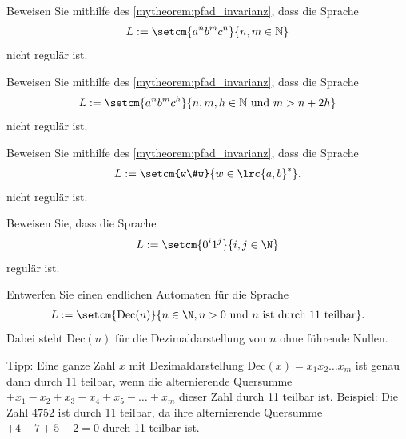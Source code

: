 \begin{myexercise}\label{myexercise:0405}
	Beweisen Sie mithilfe des \cref{mytheorem:pfad_invarianz}, dass die Sprache
	\begin{align}\label{eq:L2}
		L := \setcm{a^n b^m c^n}{n,m\in\mathbb{N}}
	\end{align}
	nicht regulär ist.
\end{myexercise}

\begin{myexercise}\label{myexercise:0406}
	Beweisen Sie mithilfe des \cref{mytheorem:pfad_invarianz}, dass die Sprache
	\begin{align}\label{eq:L3}
		L := \setcm{a^n b^m c^h}{n,m,h\in\mathbb{N} \text{ und } m > n + 2h}
	\end{align}
	nicht regulär ist.
\end{myexercise}

\begin{myexercise}\label{myexercise:0407}
	Beweisen Sie mithilfe des \cref{mytheorem:pfad_invarianz}, dass die Sprache
	\begin{align}\label{eq:L4}
		L := \setcm{w\#w}{w\in\lrc{a,b}^*}.
	\end{align}
	nicht regulär ist.
\end{myexercise}

\begin{myexercise}\label{myexercise:0408}
	Beweisen Sie, dass die Sprache
	\begin{align}\label{eq:L5}
		L := \setcm{0^i1^j}{i,j\in\N}
	\end{align}
	regulär ist.
\end{myexercise}

\begin{mychallenge}\label{mychallenge:teilbardurch11}
    Entwerfen Sie einen endlichen Automaten für die Sprache
    \begin{align*}
        L := \setcm{\text{Dec}(n)}{n\in\N, n>0 \text{ und } n \text{ ist durch 11 teilbar}}.
    \end{align*}
Dabei steht $\text{Dec}(n)$ für die Dezimaldarstellung von $n$ ohne führende Nullen.

Tipp: Eine ganze Zahl $x$ mit Dezimaldarstellung $\text{Dec}(x) = x_1x_2\ldots x_m$ ist genau dann durch 11 teilbar, wenn die alternierende Quersumme $+x_1-x_2+x_3-x_4+x_5-\ldots\pm x_m$ dieser Zahl durch 11 teilbar ist. Beispiel: Die Zahl $4752$ ist durch 11 teilbar, da ihre alternierende Quersumme $+ 4 - 7 + 5 - 2 = 0$ durch 11 teilbar ist.
\end{mychallenge}


